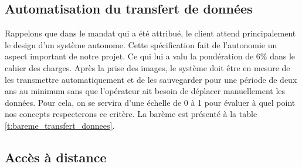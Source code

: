 
\clearpage

\subsection{Automatisation du transfert de données}

\begin{table}
   \caption{Évaluation du barème du transfert de données}
   \label{t:bareme_transfert_donnees}
\end{table}

Rappelons que dans le mandat qui a été attribué, le client attend principalement le design d’un système autonome. Cette spécification fait de l’autonomie un aspect important de notre projet. Ce qui lui a valu la pondération de 6\% dans le cahier des charges. Après la prise des images, le système doit être en mesure de les transmettre automatiquement et de les sauvegarder pour une période de deux ans au minimum sans que l'opérateur ait besoin de déplacer manuellement les données. Pour cela, on se servira d’une échelle de 0 à 1 pour évaluer à quel point nos concepts respecterons ce critère. La barème est présenté à la table \ref{t:bareme_transfert_donnees}.

\subsection{Accès à distance}

